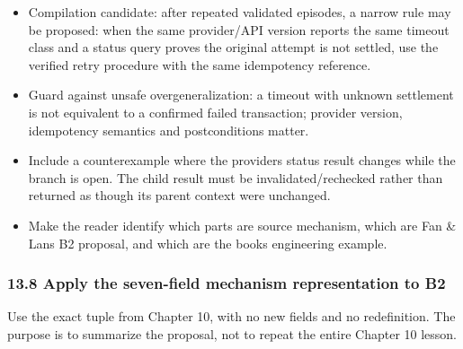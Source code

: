 \begin{itemize}
  \begin{itemize}
  \tightlist
  \item
    \texttt{settled}: return verified provider evidence; parent records completion and does not retry.
  \item
    \texttt{not\_settled}: return verified evidence; parent may consider the permitted retry path.
  \item
    \texttt{still\_unknown}: return uncertainty; parent escalates or waits rather than guessing.
  \end{itemize}
\item
  Compilation candidate: after repeated validated episodes, a narrow rule may be proposed: when the same provider/API version reports the same timeout class and a status query proves the original attempt is not settled, use the verified retry procedure with the same idempotency reference.
\item
  Guard against unsafe overgeneralization: a timeout with unknown settlement is not equivalent to a confirmed failed transaction; provider version, idempotency semantics and postconditions matter.
\item
  Include a counterexample where the provider\textquotesingle s status result changes while the branch is open. The child result must be invalidated/rechecked rather than returned as though its parent context were unchanged.
\item
  Make the reader identify which parts are source mechanism, which are Fan \& Lan\textquotesingle s B2 proposal, and which are the book\textquotesingle s engineering example.
\end{itemize}

\subsubsection{13.8 Apply the seven-field mechanism representation to B2}\label{138-apply-the-seven-field-mechanism-representation-to-b2}

Use the exact tuple from Chapter 10, with no new fields and no redefinition. The purpose is to summarize the proposal, not to repeat the entire Chapter 10 lesson.

